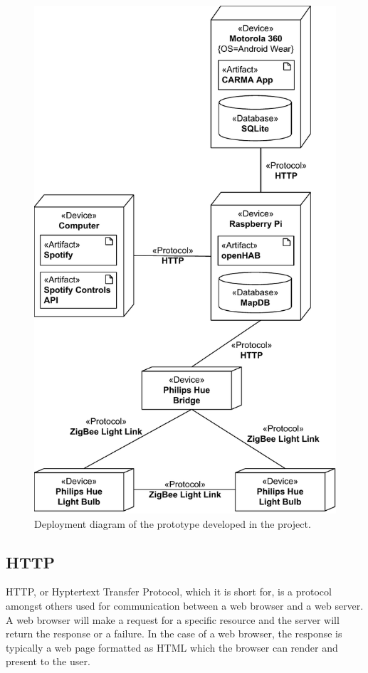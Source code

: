\begin{figure}[h!]
\centering
\includegraphics[height=\textheight]{images/deployment-diagram}
\caption{Deployment diagram of the prototype developed in the project.}
\label{fig:implementation:deployment-diagram}
\end{figure}

\subsection{HTTP}

HTTP, or Hyptertext Transfer Protocol, which it is short for, is a protocol amongst others used for communication between a web browser and a web server. A web browser will make a request for a specific resource and the server will return the response or a failure. In the case of a web browser, the response is typically a web page formatted as HTML which the browser can render and present to the user.

